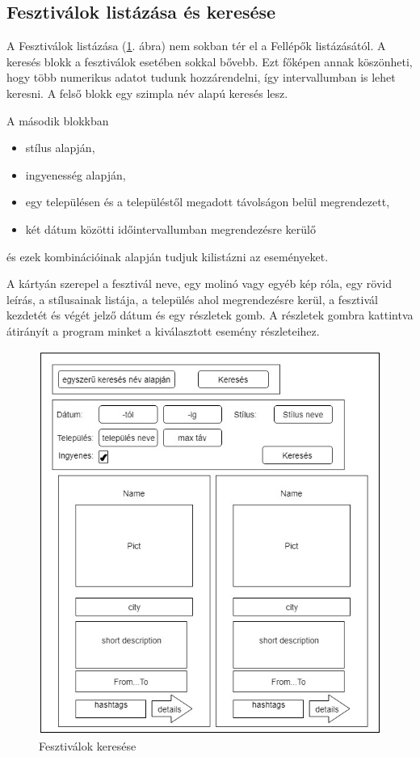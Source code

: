 \subsection{Fesztiválok listázása és keresése}

A Fesztiválok listázása (\ref{fig:fest_search}. ábra) nem sokban tér el a Fellépők listázásától. A keresés blokk a fesztiválok esetében sokkal bővebb. Ezt főképen annak köszönheti, hogy több numerikus adatot tudunk hozzárendelni, így intervallumban is lehet keresni.
A felső blokk egy szimpla név alapú keresés lesz. 

A második blokkban
\begin{itemize}
\item stílus alapján,
\item ingyenesség alapján,
\item egy településen és a településtől megadott távolságon belül megrendezett, 
\item két dátum közötti időintervallumban megrendezésre kerülő
\end{itemize}
és ezek kombinációinak alapján tudjuk kilistázni az eseményeket.

A kártyán szerepel a fesztivál neve, egy molinó vagy egyéb kép róla, egy rövid leírás, a stílusainak listája, a település ahol megrendezésre kerül, a  fesztivál kezdetét és végét jelző dátum és egy részletek gomb. A részletek gombra kattintva átirányít a program minket a kiválasztott esemény részleteihez.

\begin{figure}
\centering
\includegraphics[scale=0.5]{kepek/fest_search.jpg}
\caption{Fesztiválok keresése}
\label{fig:fest_search}
\end{figure}

